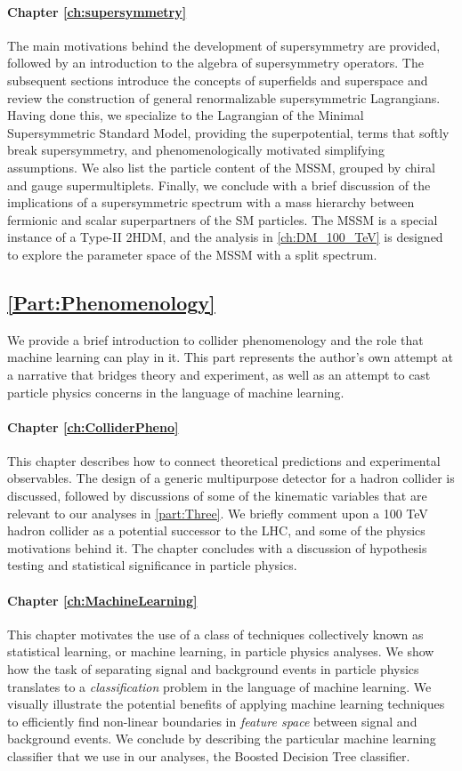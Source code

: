 \paragraph{Chapter \ref{ch:supersymmetry}} The main motivations behind the development of supersymmetry are provided, followed by an introduction to the algebra of supersymmetry operators. The subsequent sections introduce the concepts of superfields and superspace and review the construction of general renormalizable supersymmetric Lagrangians. Having done this, we specialize to the Lagrangian of the Minimal Supersymmetric Standard Model, providing the superpotential, terms that softly break supersymmetry, and phenomenologically motivated simplifying assumptions. We also list the particle content of the MSSM, grouped by chiral and gauge supermultiplets. Finally, we conclude with a brief discussion of the implications of a supersymmetric spectrum with a mass hierarchy between fermionic and scalar superpartners of the SM particles. The MSSM is a special instance of a Type-II 2HDM, and the analysis in \autoref{ch:DM_100_TeV} is designed to explore the parameter space of the MSSM with a split spectrum.  
\subsection{\autoref{Part:Phenomenology}}
We provide a brief introduction to collider phenomenology and the role that machine learning can play in it. This part represents the author's own attempt at a narrative that bridges theory and experiment, as well as an attempt to cast particle physics concerns in the language of machine learning.
\paragraph{Chapter \ref{ch:ColliderPheno}} This chapter describes how to connect theoretical predictions and experimental observables. The design of a generic multipurpose detector for a hadron collider is discussed, followed by discussions of some of the kinematic variables that are relevant to our analyses in \autoref{part:Three}. We briefly comment upon a 100 TeV hadron collider as a potential successor to the LHC, and some of the physics motivations behind it. The chapter concludes with a discussion of hypothesis testing and statistical significance in particle physics.
\paragraph{Chapter \ref{ch:MachineLearning}} This chapter motivates the use of a class of techniques collectively known as statistical learning, or machine learning, in particle physics analyses. We show how the task of separating signal and background events in particle physics translates to a \emph{classification} problem in the language of machine learning. We visually illustrate the potential benefits of applying machine learning techniques to efficiently find non-linear boundaries in \emph{feature space} between signal and background events. We conclude by describing the particular machine learning classifier that we use in our analyses, the Boosted Decision Tree classifier.

